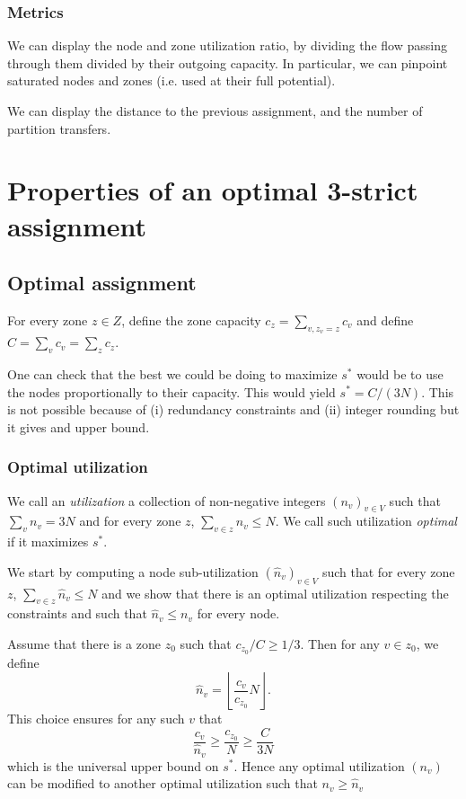 \documentclass[]{article}
\begin{document}
\subsubsection*{Metrics}
We can display the node and zone utilization ratio, by dividing the flow passing through them divided by their outgoing capacity. In particular, we can pinpoint saturated nodes and zones (i.e. used at their full potential).

We can display the distance to the previous assignment, and the number of partition transfers.





\section{Properties of an optimal 3-strict assignment}

\subsection{Optimal assignment}
\label{sec:opt_assign}

For every zone $z\in Z$, define the zone capacity $c_z = \sum_{v, z_v=z} c_v$ and define $C = \sum_v c_v = \sum_z c_z$.

One can check that the best we could be doing to maximize $s^*$ would be to use the nodes proportionally to their capacity. This would yield $s^*=C/(3N)$. This is not possible because of (i) redundancy constraints and (ii) integer rounding but it gives and upper bound. 

\subsubsection*{Optimal utilization}

We call an \emph{utilization} a collection of non-negative integers $(n_v)_{v\in V}$ such that $\sum_v n_v = 3N$ and for every zone $z$, $\sum_{v\in z} n_v \le N$. We call such utilization \emph{optimal} if it maximizes $s^*$.

We start by computing a node sub-utilization $(\hat{n}_v)_{v\in V}$ such that for every zone $z$, $\sum_{v\in z} \hat{n}_v \le N$ and we show that there is an optimal utilization respecting the constraints and such that $\hat{n}_v \le n_v$ for every node.

Assume that there is a zone $z_0$ such that $c_{z_0}/C \ge 1/3$. Then for any $v\in z_0$, we define 
$$\hat{n}_v = \left\lfloor\frac{c_v}{c_{z_0}}N\right\rfloor.$$ 
This choice ensures for any such $v$ that
$$
\frac{c_v}{\hat{n}_v} \ge \frac{c_{z_0}}{N} \ge \frac{C}{3N}
$$
which is the universal upper bound on $s^*$. Hence any optimal utilization $(n_v)$ can be modified to another optimal utilization such that $n_v\ge \hat{n}_v$
\end{document}
